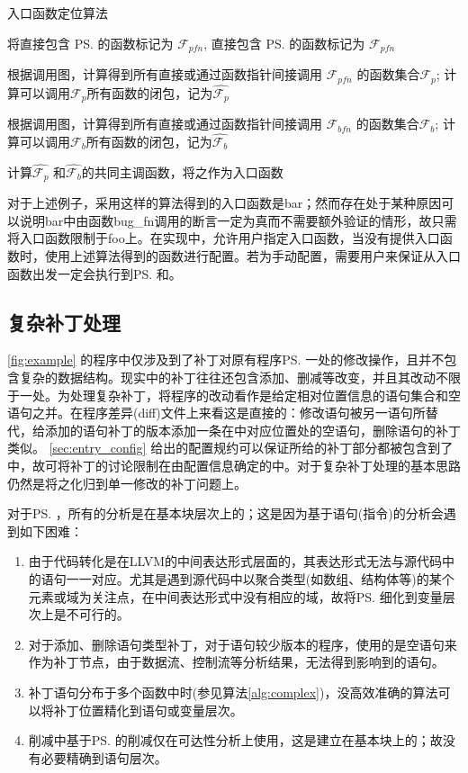 \begin{algorithm}\label{alg:entry}
\caption{入口函数定位算法}
\SetAlgoNoLine
将直接包含 \prog\ps 的函数标记为 $\mathcal{F}{_{pfn}}$, 直接包含 \prog\ps 的函数标记为 $\mathcal{F}{_{pfn}}$

根据调用图，计算得到所有直接或通过函数指针间接调用 $\mathcal{F}{_{pfn}}$ 的函数集合$\mathcal{F}_{p}$; 计算可以调用$\mathcal{F}_{p}$所有函数的闭包，记为$\widehat{\mathcal{F}_{p}}$

根据调用图，计算得到所有直接或通过函数指针间接调用 $\mathcal{F}{_{bfn}}$ 的函数集合$\mathcal{F}_{b}$; 计算可以调用$\mathcal{F}_{b}$所有函数的闭包，记为$\widehat{\mathcal{F}_{b}}$

计算$\widehat{\mathcal{F}_{p}}$ 和$\widehat{\mathcal{F}_{b}}$的共同主调函数，将之作为入口函数\prog\entry
\end{algorithm}

对于上述例子，采用这样的算法得到的入口函数是bar；然而存在处于某种原因可以说明bar中由函数bug\_fn调用的断言一定为真而不需要额外验证的情形，故只需将入口函数限制于foo上。在\dryrun 实现中，允许用户指定入口函数，当没有提供入口函数时，使用上述算法得到的函数进行配置。若为手动配置，需要用户来保证从入口函数出发一定会执行到\prog\ps 和\prog\ass 。

\subsection{复杂补丁处理}
\label{sec:complex}
\autoref{fig:example} 的程序中仅涉及到了补丁对原有程序\bug\ps 一处的修改操作，且并不包含复杂的数据结构。现实中的补丁往往还包含添加、删减等改变，并且其改动不限于一处。为处理复杂补丁，\dryrun 将程序的改动看作是给定相对位置信息的语句集合和空语句之并。在程序差异(diff)文件上来看这是直接的：修改语句被另一语句所替代，给添加的语句补丁的\bug 版本添加一条在\patch 中对应位置处的空语句，删除语句的补丁类似。 \autoref{sec:entry_config} 给出的配置规约可以保证所给的补丁部分都被包含到了\rbscope 中，故可将补丁的讨论限制在由配置信息确定的\prog\scope 中。对于复杂补丁处理的基本思路仍然是将之化归到单一修改的补丁问题上。

对于\prog\ps ，所有的分析是在基本块层次上的；这是因为基于语句(指令)的分析会遇到如下困难：
\begin{enumerate}
  \item 由于代码转化是在LLVM的中间表达形式层面的，其表达形式无法与源代码中的语句一一对应。尤其是遇到源代码中以聚合类型(如数组、结构体等)的某个元素或域为关注点，在中间表达形式中没有相应的域，故将\prog\ps 细化到变量层次上是不可行的。
  \item 对于添加、删除语句类型补丁，对于语句较少版本的程序，使用的是空语句来作为补丁节点，由于数据流、控制流等分析结果，无法得到影响到\prog\bs 的语句。
  \item 补丁语句分布于多个函数中时(参见算法\autoref{alg:complex})，没高效准确的算法可以将补丁位置精化到语句或变量层次。
  \item 削减中基于\prog\ps 的削减仅在可达性分析上使用，这是建立在基本块上的；故没有必要精确到语句层次。
\end{enumerate}

